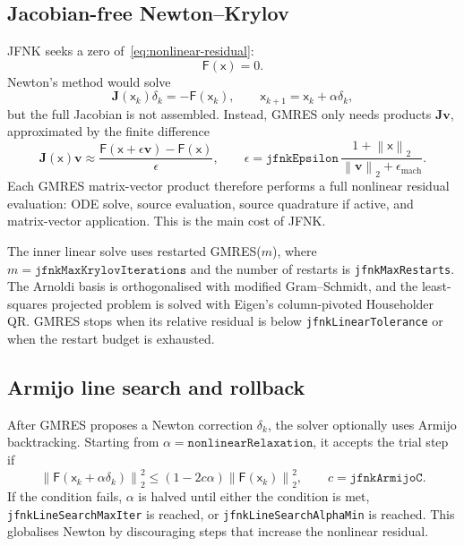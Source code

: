 \documentclass[11pt,a4paper]{article}
\newcommand{\code}[1]{\texttt{\small #1}}
\newcommand{\Fres}{\mathsf{F}}
\newcommand{\norm}[1]{\left\lVert #1 \right\rVert}
\begin{document}
\subsection{Jacobian-free Newton--Krylov}

JFNK seeks a zero of~\eqref{eq:nonlinear-residual}:
\begin{equation}
  \Fres(\mathsf{x})=0.
\end{equation}
Newton's method would solve
\begin{equation}
  \mathbf{J}(\mathsf{x}_k)\delta_k=-\Fres(\mathsf{x}_k),
  \qquad
  \mathsf{x}_{k+1}=\mathsf{x}_k+\alpha\delta_k,
\end{equation}
but the full Jacobian is not assembled. Instead, GMRES only needs products
$\mathbf{J}\mathbf{v}$, approximated by the finite difference
\begin{equation}
  \mathbf{J}(\mathsf{x})\mathbf{v}
  \approx
  \frac{\Fres(\mathsf{x}+\epsilon\mathbf{v})-\Fres(\mathsf{x})}{\epsilon},
  \qquad
  \epsilon =
  \texttt{jfnkEpsilon}\,
  \frac{1+\norm{\mathsf{x}}_2}{\norm{\mathbf{v}}_2+\epsilon_{\mathrm{mach}}}.
  \label{eq:jfnk-matvec}
\end{equation}
Each GMRES matrix-vector product therefore performs a full nonlinear residual
evaluation: ODE solve, source evaluation, source quadrature if active, and
matrix-vector application. This is the main cost of JFNK.

The inner linear solve uses restarted GMRES($m$), where
$m=\texttt{jfnkMaxKrylovIterations}$ and the number of restarts is
\code{jfnkMaxRestarts}. The Arnoldi basis is orthogonalised with modified
Gram--Schmidt, and the least-squares projected problem is solved with Eigen's
column-pivoted Householder QR. GMRES stops when its relative residual is below
\code{jfnkLinearTolerance} or when the restart budget is exhausted.

\subsection{Armijo line search and rollback}

After GMRES proposes a Newton correction $\delta_k$, the solver optionally uses
Armijo backtracking. Starting from $\alpha=\texttt{nonlinearRelaxation}$, it
accepts the trial step if
\begin{equation}
  \norm{\Fres(\mathsf{x}_k+\alpha\delta_k)}_2^2
  \le
  \left(1-2c\alpha\right)
  \norm{\Fres(\mathsf{x}_k)}_2^2,
  \qquad c=\texttt{jfnkArmijoC}.
  \label{eq:armijo}
\end{equation}
If the condition fails, $\alpha$ is halved until either the condition is met,
\code{jfnkLineSearchMaxIter} is reached, or
\code{jfnkLineSearchAlphaMin} is reached. This globalises Newton by discouraging
steps that increase the nonlinear residual.
\end{document}
